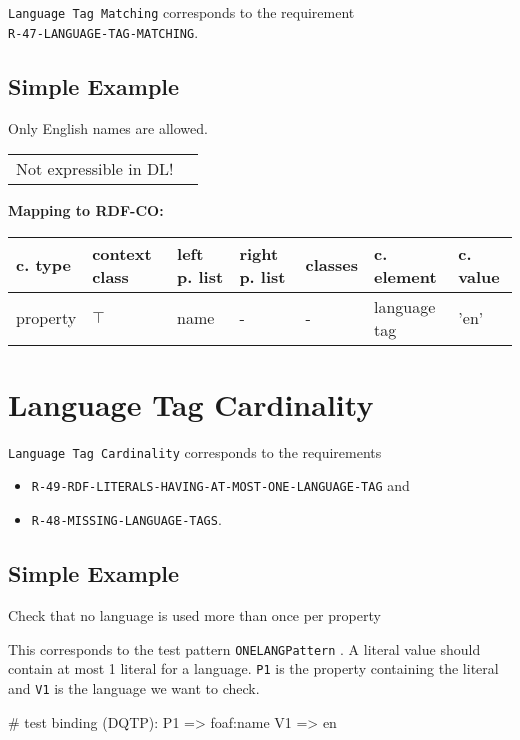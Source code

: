 \documentclass{llncs}
\newcommand{\ms}[1]{\texttt{#1}}
\newenvironment{gcotable}{
  \scriptsize
  \sffamily
  \vspace{0cm}
	\begin{center}
	\textbf{\vspace{0.4cm}Mapping to RDF-CO:} \\
  \begin{tabular}{l|l|l|l|l|l|l}
	\hline
  \textbf{c. type} & \textbf{context class} & \textbf{left p. list} & \textbf{right p. list} & \textbf{classes} & \textbf{c. element} & \textbf{c. value} \\
  \hline

}{
  \hline
  \end{tabular}
	\end{center}
}
\newenvironment{DL}{
  \vspace{0cm}
	\begin{center}
  \begin{tabular}{r l}

}{
  \end{tabular}
	\end{center}
}
\begin{document}
\ms{Language Tag Matching} corresponds to the requirement \\
\ms{R-47-LANGUAGE-TAG-MATCHING}.

\subsection{Simple Example}

Only English names are allowed.

\begin{DL}
Not expressible in DL!
\end{DL}

\begin{gcotable}
property & $\top$ & name & - & - & language tag & 'en' \\
\end{gcotable}

\section{Language Tag Cardinality}

\ms{Language Tag Cardinality} corresponds to the requirements
\begin{itemize}
	\item \ms{R-49-RDF-LITERALS-HAVING-AT-MOST-ONE-LANGUAGE-TAG} and
	\item \ms{R-48-MISSING-LANGUAGE-TAGS}.
\end{itemize}

\subsection{Simple Example}

Check that no language is used more than once per property


This corresponds to the test pattern \ms{ONELANGPattern} \cite{Kontokostas2014}.
A literal value should contain at most 1 literal for a language. 
\ms{P1} is the property containing the literal and \ms{V1} is the language we want to check.

\begin{ex}
# test binding (DQTP):
P1 => foaf:name
V1 => en
\end{ex}
\end{document}
